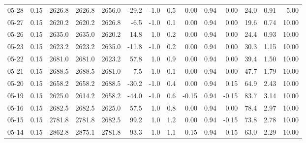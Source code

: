 \begin{threeparttable}
{\begin{tabular}{lrrrrrrrrrrrrr}
  05-28 &     0.15 & 2626.8 & 2626.8 & 2656.0 &      -29.2 &                     -1.0 &                 0.5 &       0.00 &      0.94 &           0.00 &             24.0 &            0.91 &                   5.00 \\
  05-27 &     0.15 & 2620.2 & 2620.2 & 2626.8 &       -6.5 &                     -1.0 &                 0.1 &       0.00 &      0.94 &           0.00 &             19.6 &            0.74 &                  10.00 \\
  05-26 &     0.15 & 2635.0 & 2635.0 & 2620.2 &       14.8 &                      1.0 &                 0.2 &       0.00 &      0.94 &           0.00 &             24.4 &            0.93 &                  10.00 \\
  05-23 &     0.15 & 2623.2 & 2623.2 & 2635.0 &      -11.8 &                     -1.0 &                 0.2 &       0.00 &      0.94 &           0.00 &             30.3 &            1.15 &                  10.00 \\
  05-22 &     0.15 & 2681.0 & 2681.0 & 2623.2 &       57.8 &                      1.0 &                 0.9 &       0.00 &      0.94 &           0.00 &             39.4 &            1.50 &                  10.00 \\
  05-21 &     0.15 & 2688.5 & 2688.5 & 2681.0 &        7.5 &                      1.0 &                 0.1 &       0.00 &      0.94 &           0.00 &             47.7 &            1.79 &                  10.00 \\
  05-20 &     0.15 & 2658.2 & 2658.2 & 2688.5 &      -30.2 &                     -1.0 &                 0.4 &       0.00 &      0.94 &           0.15 &             64.9 &            2.43 &                  10.00 \\
  05-19 &     0.15 & 2625.0 & 2614.2 & 2658.2 &      -44.0 &                     -1.0 &                 0.6 &      -0.15 &      0.94 &          -0.15 &             83.7 &            3.14 &                  10.00 \\
  05-16 &     0.15 & 2682.5 & 2682.5 & 2625.0 &       57.5 &                      1.0 &                 0.8 &       0.00 &      0.94 &           0.00 &             78.4 &            2.97 &                  10.00 \\
  05-15 &     0.15 & 2781.8 & 2781.8 & 2682.5 &       99.2 &                      1.0 &                 1.2 &       0.00 &      0.94 &          -0.15 &             73.8 &            2.78 &                  10.00 \\
  05-14 &     0.15 & 2862.8 & 2875.1 & 2781.8 &       93.3 &                      1.0 &                 1.1 &       0.15 &      0.94 &           0.15 &             63.0 &            2.29 &                  10.00 \\

\end{tabular}}
\end{threeparttable}
